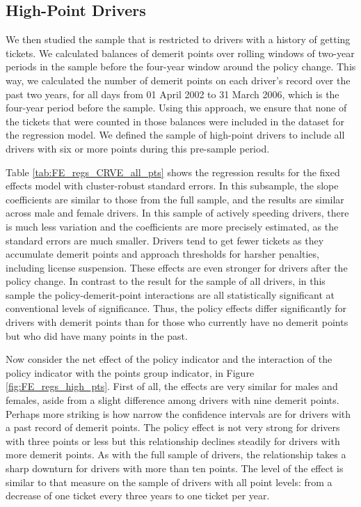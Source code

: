 \documentclass[12pt]{paper}
\begin{document}
\clearpage
\pagebreak
\subsection*{High-Point Drivers}

We then studied the sample that is restricted to drivers with a history of getting tickets. 
We calculated balances of demerit points over rolling windows of two-year periods 
in the sample before the four-year window around the policy change. 
This way, we calculated 
the number of demerit points on each driver's record over the past two years, 
for all days from 01 April 2002 to 31 March 2006, which is the four-year period before the sample. 
Using this approach, we ensure that none of the tickets that were counted in those balances were included in the dataset for the regression model. 
We defined the sample of high-point drivers to include all drivers with six or more points during this pre-sample period. 

Table \ref{tab:FE_regs_CRVE_all_pts} shows the regression results for the fixed effects model 
with cluster-robust standard errors. 
In this subsample, the slope coefficients are similar to those from the full sample, 
and the results are similar across male and female drivers. 
In this sample of actively speeding drivers, there is much less variation and the coefficients are more precisely estimated, 
as the standard errors are much smaller. 
Drivers tend to get fewer tickets as they accumulate demerit points and approach thresholds for harsher penalties, 
including license suspension. 
These effects are even stronger for drivers after the policy change. 
In contrast to the result for the sample of all drivers, 
in this sample the policy-demerit-point interactions are all statistically significant 
at conventional levels of significance. 
Thus, the policy effects differ significantly for drivers with demerit points than for those who 
currently have no demerit points but who did have many points in the past. 











Now consider the net effect of the policy indicator and the interaction of the policy 
indicator with the points group indicator, in Figure \ref{fig:FE_regs_high_pts}. 
First of all, the effects are very similar for males and females, aside from a slight difference among 
drivers with nine demerit points. 
Perhaps more striking is how narrow the confidence intervals are for drivers with a past record of demerit points. 
The policy effect is not very strong for drivers with three points or less but this 
relationship declines steadily for drivers with more demerit points. 
As with the full sample of drivers, the relationship takes a sharp downturn for drivers
with more than ten points. 
The level of the effect is similar to that measure on the sample of drivers with all point levels:
from a decrease of one ticket every three years to one ticket per year. 
\end{document}
